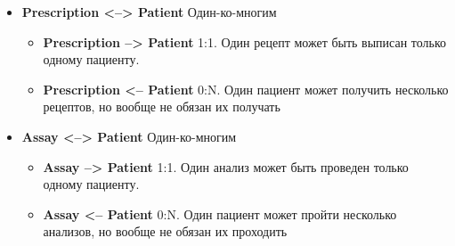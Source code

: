 \documentclass[a4paper, 14pt]{extarticle}
\begin{document}
\begin{itemize}
    \item \textbf{Prescription <--> Patient} Один-ко-многим
    \begin{itemize}
        \item \textbf{Prescription --> Patient} 1:1. Один рецепт может быть выписан только одному пациенту.
        \item \textbf{Prescription <-- Patient} 0:N. Один пациент может получить несколько рецептов, но вообще не обязан их получать
    \end{itemize}

    \item \textbf{Assay <--> Patient} Один-ко-многим
    \begin{itemize}
        \item \textbf{Assay --> Patient} 1:1. Один анализ может быть проведен только одному пациенту.
        \item \textbf{Assay <-- Patient} 0:N. Один пациент может пройти несколько анализов, но вообще не обязан их проходить
    \end{itemize}
\end{itemize}
\end{document}
